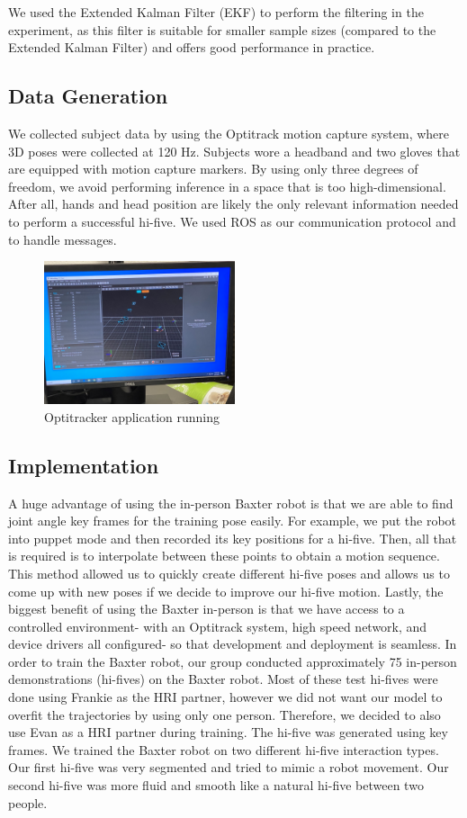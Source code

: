 \documentclass[letterpaper, 10 pt, conference]{ieeeconf}  %
\begin{document}
We used the Extended Kalman Filter (EKF) to perform the filtering in the experiment, as this filter is suitable for smaller sample sizes (compared to the Extended Kalman Filter) and offers good performance in practice.

\subsection{Data Generation}
We collected subject data by using the Optitrack motion capture system, where 3D poses were collected at 120 Hz. Subjects wore a headband and two gloves that are equipped with motion capture markers. By using only three degrees of freedom, we avoid performing inference in a space that is too high-dimensional. After all, hands and head position are likely the only relevant information needed to perform a successful hi-five. We used ROS as our communication protocol and to handle messages.

\begin{figure}[h]
\centering
\includegraphics[width=0.5\textwidth]{Optitracker.jpg}
\caption{Optitracker application running}
\end{figure}

\subsection{Implementation}
A huge advantage of using the in-person Baxter robot is that we are able to find joint angle key frames for the training pose easily. For example, we put the robot into puppet mode and then recorded its key positions for a hi-five. Then, all that is required is to interpolate between these points to obtain a motion sequence. This method allowed us to quickly create different hi-five poses and allows us to come up with new poses if we decide to improve our hi-five motion. Lastly, the biggest benefit of using the Baxter in-person is that we have access to a controlled environment- with an Optitrack system, high speed network, and device drivers all configured- so that development and deployment is seamless.
\newline
\indent In order to train the Baxter robot, our group conducted approximately 75 in-person demonstrations (hi-fives) on the Baxter robot. Most of these test hi-fives were done using Frankie as the HRI partner, however we did not want our model to overfit the trajectories by using only one person. Therefore, we decided to also use Evan as a HRI partner during training. The hi-five was generated using key frames. We trained the Baxter robot on two different hi-five interaction types. Our first hi-five was very segmented and tried to mimic a robot movement. Our second hi-five was more fluid and smooth like a natural hi-five between two people. 
\end{document}
